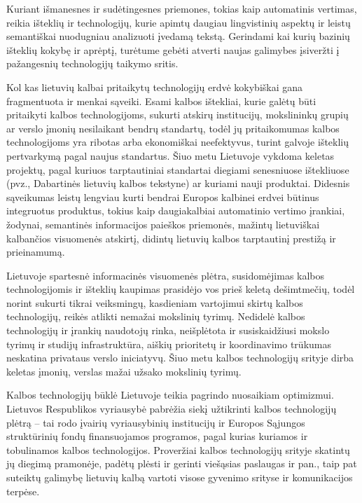 \begin{multicols}{2}
Kuriant išmanesnes ir sudėtingesnes priemones, tokias kaip automatinis vertimas, reikia išteklių ir technologijų, kurie apimtų daugiau lingvistinių aspektų ir leistų semantiškai  nuodugniau analizuoti įvedamą tekstą. Gerindami kai kurių bazinių išteklių kokybę ir aprėptį, turėtume gebėti atverti naujas galimybes įsiveržti į pažangesnių technologijų taikymo sritis.

Kol kas lietuvių kalbai pritaikytų technologijų erdvė kokybiškai gana fragmentuota ir menkai sąveiki. Esami kalbos ištekliai, kurie galėtų būti pritaikyti kalbos technologijoms, sukurti atskirų institucijų, mokslininkų grupių ar verslo įmonių nesilaikant bendrų standartų, todėl jų pritaikomumas kalbos technologijoms yra ribotas arba ekonomiškai neefektyvus, turint galvoje išteklių pertvarkymą pagal naujus standartus. 
Šiuo metu Lietuvoje vykdoma keletas projektų, pagal kuriuos tarptautiniai standartai diegiami senesniuose ištekliuose (pvz., Dabartinės lietuvių kalbos tekstyne) ar kuriami nauji produktai. Didesnis sąveikumas leistų lengviau kurti bendrai Europos kalbinei erdvei būtinus integruotus produktus, tokius kaip daugiakalbiai automatinio vertimo įrankiai, žodynai, semantinės informacijos paieškos priemonės, mažintų lietuviškai kalbančios visuomenės atskirtį, didintų lietuvių kalbos tarptautinį prestižą ir prieinamumą.

Lietuvoje spartesnė informacinės visuomenės plėtra, susidomėjimas kalbos technologijomis ir išteklių kaupimas prasidėjo vos prieš keletą dešimtmečių, todėl norint sukurti tikrai veiksmingų, kasdieniam vartojimui skirtų kalbos technologijų, reikės atlikti nemažai mokslinių tyrimų. Nedidelė kalbos technologijų ir įrankių naudotojų rinka, neišplėtota ir susiskaidžiusi mokslo tyrimų ir studijų infrastruktūra, aiškių prioritetų ir koordinavimo trūkumas neskatina privataus verslo iniciatyvų. Šiuo metu kalbos technologijų srityje dirba keletas įmonių, verslas mažai užsako mokslinių tyrimų. 

Kalbos technologijų būklė Lietuvoje teikia pagrindo nuosaikiam optimizmui. Lietuvos Respublikos vyriausybė pabrėžia siekį užtikrinti kalbos technologijų plėtrą – tai rodo įvairių vyriausybinių institucijų ir Europos Sąjungos struktūrinių fondų finansuojamos programos, pagal kurias kuriamos ir tobulinamos kalbos technologijos. Proveržiai kalbos technologijų srityje skatintų jų diegimą pramonėje, padėtų plėsti ir gerinti viešąsias paslaugas ir pan., taip pat suteiktų galimybę lietuvių kalbą vartoti visose gyvenimo srityse ir komunikacijos terpėse.


\end{multicols}
